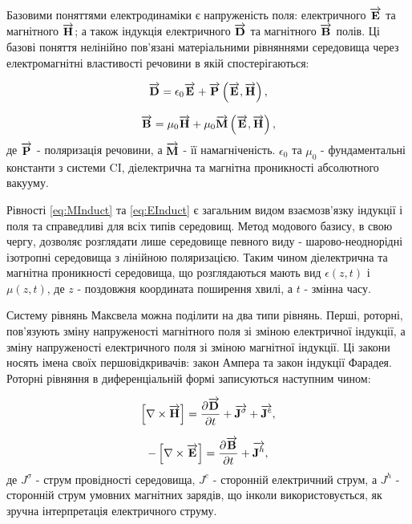 Базовими поняттями електродинаміки є напруженість поля: електричного 
$ \overrightarrow{\mathbf E} $ та магнітного $ \overrightarrow{\mathbf H} $; а також індукція електричного 
$ \overrightarrow{\mathbf D} $ та магнітного $ \overrightarrow{\mathbf B} $ полів. Ці базові поняття нелінійно 
пов'язані матеріальними рівняннями середовища через електромагнітні 
властивості речовини в якій спостерігаються:

\begin{equation} \label{eq:MInduct}
\overrightarrow{\mathbf D} = \epsilon_0 \overrightarrow{\mathbf E} + \overrightarrow{\mathbf P} \left( \overrightarrow{\mathbf E},\overrightarrow{\mathbf H} \right),
\end{equation}

\begin{equation} \label{eq:EInduct} 
\overrightarrow{\mathbf B} = \mu_0 \overrightarrow{\mathbf H} + \mu_0 \overrightarrow{\mathbf M} \left( \overrightarrow{\mathbf E},\overrightarrow{\mathbf H} \right),
\end{equation}
%
де $ \overrightarrow{\mathbf P} $ - поляризація речовини, а $ \overrightarrow{\mathbf M} $ - її намагніченість.
$ \epsilon_0 $ та $ \mu_0 $ - фундаментальні константи з системи CI, 
діелектрична та магнітна проникності абсолютного вакууму.

Рівності \eqref{eq:MInduct} та \eqref{eq:EInduct} є загальним видом 
взаємозв'язку індукції і поля та справедливі для всіх типів середовищ.
Метод модового базису, в свою чергу, дозволяє розглядати лише середовище 
певного виду - шарово-неоднорідні ізотропні середовища з лінійною поляризацією.
Таким чином діелектрична та магнітна проникності середовища, що розглядаються 
мають вид $ \epsilon(z,t) $ і $ \mu(z,t) $, де $ z $ - поздовжня координата 
поширення хвилі, а $ t $ - змінна часу.

Систему рівнянь Максвела можна поділити на два типи рівнянь. Перші, роторні,
пов'язують зміну напруженості магнітного поля зі зміною електричної індукції, 
а зміну напруженості електричного поля зі зміною магнітної індукції. Ці закони 
носять імена своїх першовідкривачів: закон Ампера та закон індукції Фарадея.
Роторні рівняння в диференціальній формі записуються наступним чином:

\begin{equation} \label{eq:AmpereLow}
\left[ \nabla \times \overrightarrow{\mathbf H} \right] = 
\frac{\partial \overrightarrow{\mathbf D}}{\partial t} + \overrightarrow{\mathbf J^\sigma} + \overrightarrow{\mathbf J^e},
\end{equation}

\begin{equation} \label{eq:FaradayInduction}
- \left[ \nabla \times \overrightarrow{\mathbf E} \right] =
\frac{\partial \overrightarrow{\mathbf B}}{\partial t} + \overrightarrow{\mathbf J^h},
\end{equation}
%
де $ J^\sigma $ - струм провідності середовища, $ J^e $ - сторонній 
електричний струм, а $ J^h $ - сторонній струм умовних магнітних зарядів, що
інколи використовується, як зручна інтерпретація електричного струму.

